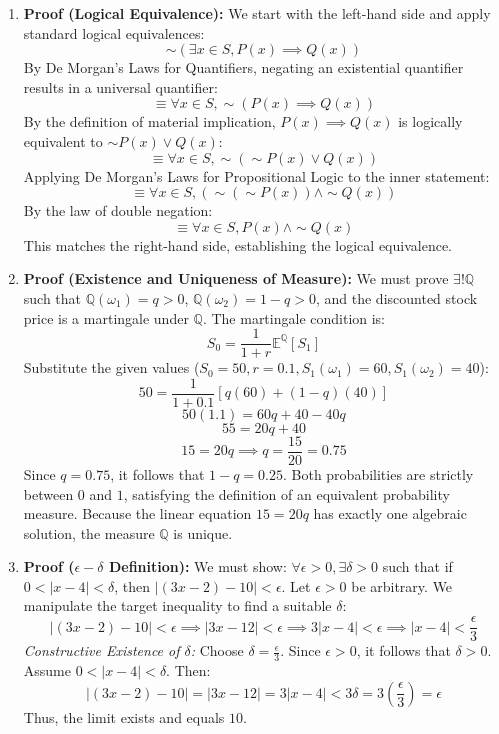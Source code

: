 \documentclass[11pt]{article}
\begin{document}
\begin{enumerate}
    \item \textbf{Proof (Logical Equivalence):} We start with the left-hand side and apply standard logical equivalences:
    \[ \sim(\exists x \in S, P(x) \implies Q(x)) \]
    By De Morgan's Laws for Quantifiers, negating an existential quantifier results in a universal quantifier:
    \[ \equiv \forall x \in S, \sim(P(x) \implies Q(x)) \]
    By the definition of material implication, $P(x) \implies Q(x)$ is logically equivalent to $\sim P(x) \lor Q(x)$:
    \[ \equiv \forall x \in S, \sim(\sim P(x) \lor Q(x)) \]
    Applying De Morgan's Laws for Propositional Logic to the inner statement:
    \[ \equiv \forall x \in S, (\sim(\sim P(x)) \land \sim Q(x)) \]
    By the law of double negation:
    \[ \equiv \forall x \in S, P(x) \land \sim Q(x) \]
    This matches the right-hand side, establishing the logical equivalence. \qedhere

    \item \textbf{Proof (Existence and Uniqueness of Measure):} We must prove $\exists! \mathbb{Q}$ such that $\mathbb{Q}(\omega_1) = q > 0$, $\mathbb{Q}(\omega_2) = 1 - q > 0$, and the discounted stock price is a martingale under $\mathbb{Q}$. The martingale condition is:
    \[ S_0 = \frac{1}{1+r} \mathbb{E}^\mathbb{Q}[S_1] \]
    Substitute the given values ($S_0 = 50, r = 0.1, S_1(\omega_1) = 60, S_1(\omega_2) = 40$):
    \[ 50 = \frac{1}{1 + 0.1} [q(60) + (1-q)(40)] \]
    \[ 50(1.1) = 60q + 40 - 40q \]
    \[ 55 = 20q + 40 \]
    \[ 15 = 20q \implies q = \frac{15}{20} = 0.75 \]
    Since $q = 0.75$, it follows that $1 - q = 0.25$. Both probabilities are strictly between $0$ and $1$, satisfying the definition of an equivalent probability measure. Because the linear equation $15 = 20q$ has exactly one algebraic solution, the measure $\mathbb{Q}$ is unique. \qedhere

    \item \textbf{Proof ($\epsilon-\delta$ Definition):} We must show: $\forall \epsilon > 0, \exists \delta > 0$ such that if $0 < |x - 4| < \delta$, then $|(3x - 2) - 10| < \epsilon$.
    Let $\epsilon > 0$ be arbitrary. We manipulate the target inequality to find a suitable $\delta$:
    \[ |(3x - 2) - 10| < \epsilon \implies |3x - 12| < \epsilon \implies 3|x - 4| < \epsilon \implies |x - 4| < \frac{\epsilon}{3} \]
    \textit{Constructive Existence of $\delta$:} Choose $\delta = \frac{\epsilon}{3}$. Since $\epsilon > 0$, it follows that $\delta > 0$. 
    Assume $0 < |x - 4| < \delta$. Then:
    \[ |(3x - 2) - 10| = |3x - 12| = 3|x - 4| < 3\delta = 3\left(\frac{\epsilon}{3}\right) = \epsilon \]
    Thus, the limit exists and equals $10$. \qedhere


\end{enumerate}
\end{document}
